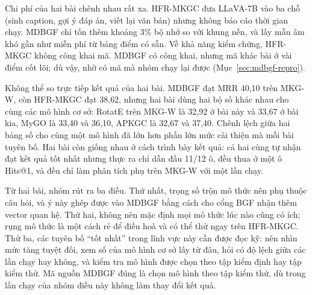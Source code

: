 \documentclass[conference,a4paper]{IEEEtran}
\begin{document}
Chi phí của hai bài chênh nhau rất xa. HFR-MKGC đưa LLaVA-7B vào ba chỗ (sinh caption, gợi ý đáp án, viết lại văn bản) nhưng không báo cáo thời gian chạy. MDBGF chỉ tốn thêm khoảng 3\% bộ nhớ so với khung nền, và lấy mẫu âm khó gần như miễn phí từ bảng điểm có sẵn. Về khả năng kiểm chứng, HFR-MKGC không công khai mã. MDBGF có công khai, nhưng mã khác bài ở vài điểm cốt lõi; dù vậy, nhờ có mã mà nhóm chạy lại được (Mục~\ref{sec:mdbgf-repro}).

Không thể so trực tiếp kết quả của hai bài. MDBGF đạt MRR 40{,}10 trên MKG-W, còn HFR-MKGC đạt 38{,}62, nhưng hai bài dùng hai bộ số khác nhau cho cùng các mô hình cơ sở: RotatE trên MKG-W là 32{,}92 ở bài này và 33{,}67 ở bài kia, MyGO là 33{,}40 và 36{,}10, APKGC là 32{,}67 và 37{,}40. Chênh lệch giữa hai bảng số cho cùng một mô hình đã lớn hơn phần lớn mức cải thiện mà mỗi bài tuyên bố. Hai bài còn giống nhau ở cách trình bày kết quả: cả hai cùng tự nhận đạt kết quả tốt nhất nhưng thực ra chỉ dẫn đầu 11/12 ô, đều thua ở một ô Hits@1, và đều chỉ làm phân tích phụ trên MKG-W với một lần chạy.

Từ hai bài, nhóm rút ra ba điều. Thứ nhất, trọng số trộn mô thức nên phụ thuộc câu hỏi, và ý này ghép được vào MDBGF bằng cách cho cổng BGF nhận thêm vector quan hệ. Thứ hai, không nên mặc định mọi mô thức lúc nào cũng có ích; rụng mô thức là một cách rẻ để điều hoà và có thể thử ngay trên HFR-MKGC. Thứ ba, các tuyên bố ``tốt nhất'' trong lĩnh vực này cần được đọc kỹ: nên nhìn mức tăng tuyệt đối, xem số của mô hình cơ sở lấy từ đâu, hỏi có độ lệch giữa các lần chạy hay không, và kiểm tra mô hình được chọn theo tập kiểm định hay tập kiểm thử. Mã nguồn MDBGF đúng là chọn mô hình theo tập kiểm thử, dù trong lần chạy của nhóm điều này không làm thay đổi kết quả.



\end{document}
